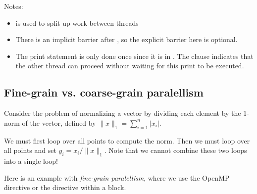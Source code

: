 \documentclass[letterpaper,10pt,english]{sphinxmanual}
\begin{document}
Notes:
\begin{itemize}
\item {} 
 is used to split up work between threads

\item {} 
There is an implicit barrier after , so the
explicit barrier here is optional.

\item {} 
The print statement is only done once since it is in .
The  clause indicates that the other thread can proceed without
waiting for this print to be executed.

\end{itemize}


\subsection{Fine-grain vs. coarse-grain paralellism}
\label{openmp:fine-grain-vs-coarse-grain-paralellism}
Consider the problem of normalizing a vector by dividing each element by the
1-norm of the vector, defined by \(\|x\|_1 = \sum_{i=1}^n |x_i|\).

We must first loop over all points to compute the norm.  Then we must loop
over all points and set \(y_i = x_i / \|x\|_1\).  Note that we cannot
combine these two loops into a single loop!

Here is an example with \emph{fine-grain paralellism}, where we use the OpenMP
 directive or the  directive within a  block.
\end{document}
